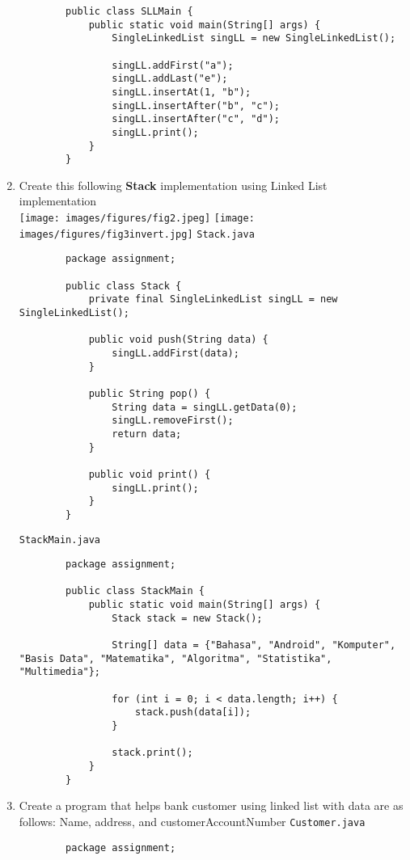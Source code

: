 \documentclass[12pt,titlepage]{article}
\begin{document}
\begin{enumerate}
\begin{verbatim}
        public class SLLMain {
            public static void main(String[] args) {
                SingleLinkedList singLL = new SingleLinkedList();
            
                singLL.addFirst("a");
                singLL.addLast("e");
                singLL.insertAt(1, "b");
                singLL.insertAfter("b", "c");
                singLL.insertAfter("c", "d");
                singLL.print();
            }
        }
    \end{verbatim}
    \item Create this following \textbf{Stack} implementation using Linked List implementation
    \hbox{}\\
    \texttt{[image: images/figures/fig2.jpeg]}
    \texttt{[image: images/figures/fig3invert.jpg]}
    \texttt{Stack.java}
    \begin{verbatim}
        package assignment;

        public class Stack {
            private final SingleLinkedList singLL = new SingleLinkedList();

            public void push(String data) {
                singLL.addFirst(data);
            }

            public String pop() {
                String data = singLL.getData(0);
                singLL.removeFirst();
                return data;
            }

            public void print() {
                singLL.print();
            }
        }
    \end{verbatim}
    \texttt{StackMain.java}
    \begin{verbatim}
        package assignment;

        public class StackMain {
            public static void main(String[] args) {
                Stack stack = new Stack();

                String[] data = {"Bahasa", "Android", "Komputer", "Basis Data", "Matematika", "Algoritma", "Statistika", "Multimedia"};

                for (int i = 0; i < data.length; i++) {
                    stack.push(data[i]);
                }

                stack.print();
            }
        }
    \end{verbatim}
    \item Create a program that helps bank customer using linked list with data are as follows: Name, address, and customerAccountNumber
    \texttt{Customer.java}
    \begin{verbatim}
        package assignment;


\end{verbatim}
\end{enumerate}
\end{document}
